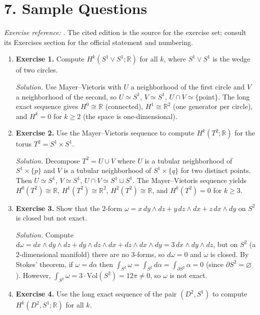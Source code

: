 \section*{7. Sample Questions}
\emph{Exercise reference:} \cite{cohomology_theory_ref1}. The cited edition is the source for the exercise set; consult its Exercises section for the official statement and numbering.
\begin{enumerate}[leftmargin=*,itemsep=0.9em]

\item \textbf{Exercise 1.} Compute $H^k(S^1\vee S^1;\mathbb{R})$ for all $k$, where $S^1\vee S^1$ is the wedge of two circles.

\emph{Solution.} Use Mayer--Vietoris with $U$ a neighborhood of the first circle and $V$ a neighborhood of the second, so $U\simeq S^1$, $V\simeq S^1$, $U\cap V\simeq\{\text{point}\}$. The long exact sequence gives $H^0\cong\mathbb{R}$ (connected), $H^1\cong\mathbb{R}^2$ (one generator per circle), and $H^k=0$ for $k\geq 2$ (the space is one-dimensional).

\item \textbf{Exercise 2.} Use the Mayer--Vietoris sequence to compute $H^k(T^2;\mathbb{R})$ for the torus $T^2=S^1\times S^1$.

\emph{Solution.} Decompose $T^2=U\cup V$ where $U$ is a tubular neighborhood of $S^1\times\{p\}$ and $V$ is a tubular neighborhood of $S^1\times\{q\}$ for two distinct points. Then $U\simeq S^1$, $V\simeq S^1$, $U\cap V\simeq S^1\sqcup S^1$. The Mayer--Vietoris sequence yields $H^0(T^2)\cong\mathbb{R}$, $H^1(T^2)\cong\mathbb{R}^2$, $H^2(T^2)\cong\mathbb{R}$, and $H^k(T^2)=0$ for $k\geq 3$.

\item \textbf{Exercise 3.} Show that the $2$-form $\omega=x\,dy\wedge dz+y\,dz\wedge dx+z\,dx\wedge dy$ on $S^2$ is closed but not exact.

\emph{Solution.} Compute $d\omega=dx\wedge dy\wedge dz+dy\wedge dz\wedge dx+dz\wedge dx\wedge dy=3\,dx\wedge dy\wedge dz$, but on $S^2$ (a $2$-dimensional manifold) there are no $3$-forms, so $d\omega=0$ and $\omega$ is closed. By Stokes' theorem, if $\omega=d\alpha$ then $\int_{S^2}\omega=\int_{S^2}d\alpha=\int_{\partial S^2}\alpha=0$ (since $\partial S^2=\varnothing$). However, $\int_{S^2}\omega=3\cdot\text{Vol}(S^2)=12\pi\neq 0$, so $\omega$ is not exact.

\item \textbf{Exercise 4.} Use the long exact sequence of the pair $(D^2,S^1)$ to compute $H^k(D^2,S^1;\mathbb{R})$ for all $k$.


\end{enumerate}
